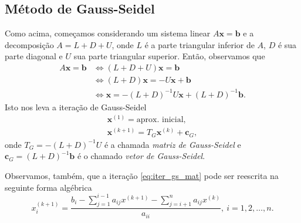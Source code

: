 \subsection{Método de Gauss-Seidel}

Como acima, começamos considerando um sistema linear $A\pmb{x} = \pmb{b}$ e a decomposição $A = L + D + U$, onde $L$ é a parte triangular inferior de $A$, $D$ é sua parte diagonal e $U$ sua parte triangular superior. Então, observamos que
\begin{align}
  A\pmb{x} = \pmb{b} &\Leftrightarrow (L + D + U)\pmb{x} = \pmb{b}\\
  &\Leftrightarrow (L+D)\pmb{x} = -U\pmb{x} + \pmb{b}\\
  &\Leftrightarrow \pmb{x} = -(L+D)^{-1}U\pmb{x} + (L+D)^{-1}\pmb{b}.
\end{align}
Isto nos leva a iteração de Gauss-Seidel
\begin{align}
  \pmb{x}^{(1)} = \text{aprox. inicial},\\
  \pmb{x}^{(k+1)} = T_G\pmb{x}^{(k)} + \pmb{c}_G,\label{eq:iter_gs_mat}
\end{align}
onde $T_G = -(L+D)^{-1}U$ é a chamada \emph{matriz de Gauss-Seidel} e $\pmb{c}_G = (L+D)^{-1}\pmb{b}$ é o chamado \emph{vetor de Gauss-Seidel}.

Observamos, também, que a iteração \eqref{eq:iter_gs_mat} pode ser reescrita na seguinte forma algébrica
\begin{equation}
  x_i^{(k+1)} = \frac{{\displaystyle b_i - \sum_{j=1}^{i-1} a_{ij}x^{(k+1)} - \sum_{j=i+1}^{n} a_{ij}x^{(k)}}}{a_{ii}},~i=1, 2, \dotsc, n.
\end{equation}

